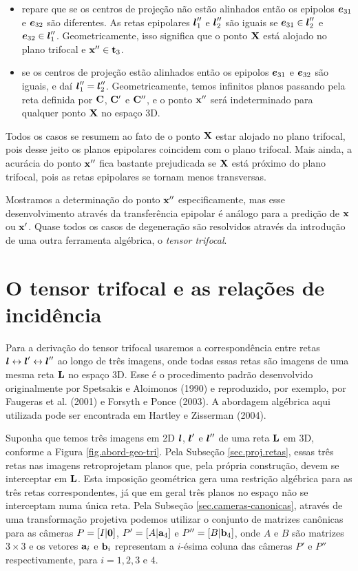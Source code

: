 \begin{itemize}
\item repare que se os centros de projeção não estão alinhados então os epipolos $\boldsymbol{e}_{31}$ e $\boldsymbol{e}_{32}$ são diferentes. As retas epipolares $\boldsymbol{l}''_1$ e $\boldsymbol{l}''_2$ são iguais se $\boldsymbol{e}_{31}\in\boldsymbol{l}''_2$ e $\boldsymbol{e}_{32}\in\boldsymbol{l}''_1$. Geometricamente, isso significa que o ponto $\mathbf{X}$ está alojado no plano trifocal e $\mathbf{x}''\in{\bf t}_3$.

\item se os centros de projeção estão alinhados então os epipolos $\boldsymbol{e}_{31}$ e $\boldsymbol{e}_{32}$ são iguais, e daí $\boldsymbol{l}''_1=\boldsymbol{l}''_2$. Geometricamente, temos infinitos planos passando pela reta definida por ${\bf C}$, ${\bf C}'$ e ${\bf C}''$, e o ponto $\mathbf{x}''$ será indeterminado para qualquer ponto $\mathbf{X}$ no espaço 3D.
\end{itemize}

Todos os casos se resumem ao fato de o ponto $\mathbf{X}$ estar alojado no plano trifocal, pois desse jeito os planos epipolares coincidem com o plano trifocal. Mais ainda, a acurácia do ponto $\mathbf{x}''$ fica bastante prejudicada se $\mathbf{X}$ está próximo do plano trifocal, pois as retas epipolares se tornam menos transversas. 

Mostramos a determinação do ponto $\mathbf{x}''$ especificamente, mas esse desenvolvimento através da transferência epipolar é análogo para a predição de $\mathbf{x}$ ou $\mathbf{x}'$. Quase todos os casos de degeneração são resolvidos através da introdução de uma outra ferramenta algébrica, o {\it tensor trifocal}.

\section{O tensor trifocal e as relações de incidência}\label{sec.tensor-tri-rela-inci}

Para a derivação do tensor trifocal usaremos a correspondência entre retas $\boldsymbol{l}\leftrightarrow\boldsymbol{l}'\leftrightarrow\boldsymbol{l}''$ ao longo de três imagens, onde todas essas retas são imagens de uma mesma reta $\bf L$ no espaço 3D. Esse é o procedimento padrão desenvolvido originalmente por Spetsakis e Aloimonos (1990) e reproduzido, por exemplo, por Faugeras et al. (2001) e Forsyth e Ponce (2003). A abordagem algébrica aqui utilizada pode ser encontrada em Hartley e Zisserman (2004).

Suponha que temos três imagens em 2D $\boldsymbol{l}$, $\boldsymbol{l}'$ e $\boldsymbol{l}''$  de uma reta ${\bf L}$ em 3D, conforme a Figura \ref{fig.abord-geo-tri}. Pela Subseção \ref{sec.proj.retas}, essas três retas nas imagens retroprojetam planos que, pela própria construção, devem se interceptar em ${\bf L}$. Esta imposição geométrica gera uma restrição algébrica para as três retas correspondentes, já que em geral três planos no espaço não se interceptam numa única reta. Pela Subseção \ref{sec.cameras-canonicas}, através de uma transformação projetiva podemos utilizar o conjunto de matrizes canônicas para as câmeras $P=[I|{\bf 0}]$, $P'=[A|{\bf a}_4]$ e $P''=[B|{\bf b}_4]$, onde $A$ e $B$ são matrizes $3\times3$ e os vetores ${\bf a}_i$ e ${\bf b}_i$ representam a $i$-ésima coluna das câmeras $P'$ e $P''$ respectivamente, para $i=1,2,3 \,\,\text{e}\,\, 4$.

